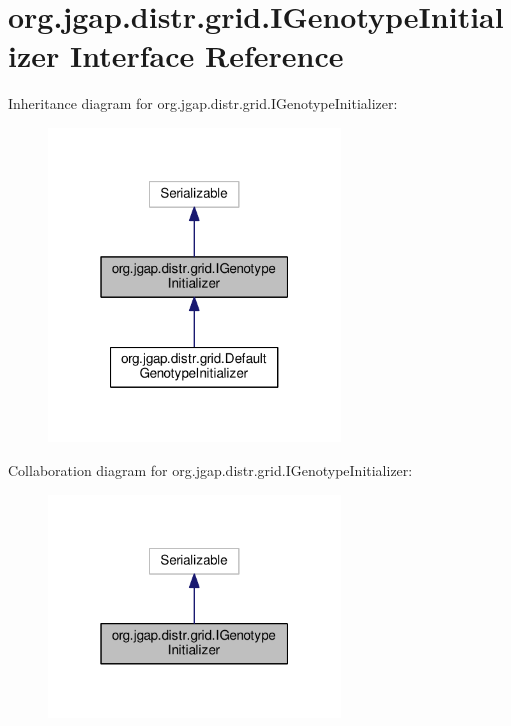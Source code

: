\hypertarget{interfaceorg_1_1jgap_1_1distr_1_1grid_1_1_i_genotype_initializer}{\section{org.\-jgap.\-distr.\-grid.\-I\-Genotype\-Initializer Interface Reference}
\label{interfaceorg_1_1jgap_1_1distr_1_1grid_1_1_i_genotype_initializer}
}


Inheritance diagram for org.\-jgap.\-distr.\-grid.\-I\-Genotype\-Initializer\-:
\nopagebreak
\begin{figure}[H]
\begin{center}
\leavevmode
\includegraphics[width=220pt]{interfaceorg_1_1jgap_1_1distr_1_1grid_1_1_i_genotype_initializer__inherit__graph}
\end{center}
\end{figure}


Collaboration diagram for org.\-jgap.\-distr.\-grid.\-I\-Genotype\-Initializer\-:
\nopagebreak
\begin{figure}[H]
\begin{center}
\leavevmode
\includegraphics[width=220pt]{interfaceorg_1_1jgap_1_1distr_1_1grid_1_1_i_genotype_initializer__coll__graph}
\end{center}
\end{figure}
